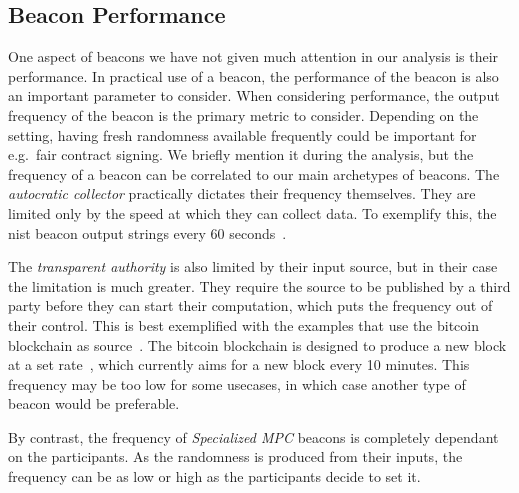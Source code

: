 \subsection{Beacon Performance}
One aspect of beacons we have not given much attention in our analysis is their performance.
In practical use of a beacon, the performance of the beacon is also an important parameter to consider.
When considering performance, the output frequency of the beacon is the primary metric to consider.
Depending on the setting, having fresh randomness available frequently could be important for e.g.\ fair contract signing\cite{rabin1983transaction}.
We briefly mention it during the analysis, but the frequency of a beacon can be correlated to our main archetypes of beacons.
The \emph{autocratic collector} practically dictates their frequency themselves.
They are limited only by the speed at which they can collect data.
To exemplify this, the \gls{nist} beacon output strings every 60 seconds~\cite{nistbeacon}.

The \emph{transparent authority} is also limited by their input source, but in their case the limitation is much greater.
They require the source to be published by a third party before they can start their computation, which puts the frequency out of their control.
This is best exemplified with the examples that use the bitcoin blockchain as source~\cite{bonneau2015bitcoin, bentov2016bitcoin, bunz2017proofsof}.
The bitcoin blockchain is designed to produce a new block at a set rate~\cite{nakamoto2008bitcoin}, which currently aims for a new block every 10 minutes.
This frequency may be too low for some usecases, in which case another type of beacon would be preferable.

By contrast, the frequency of \emph{Specialized MPC} beacons is completely dependant on the participants.
As the randomness is produced from their inputs, the frequency can be as low or high as the participants decide to set it.
